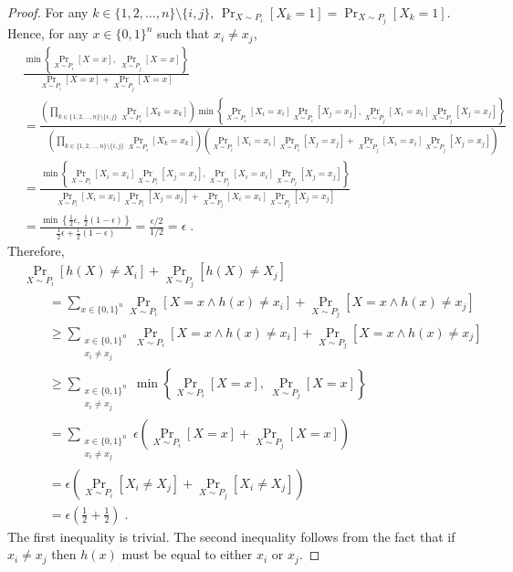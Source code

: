 \documentclass[12pt]{article}
\begin{document}
\begin{proof}
For any $k \in \{1,2,\dots,n\} \setminus \{i,j\}$, $\Pr_{X \sim P_i}[X_k = 1] = \Pr_{X \sim P_j}[X_k = 1]$.
Hence, for any $x \in \{0,1\}^n$ such that $x_i \neq x_j$,
\begin{align*}
& \frac{\displaystyle \min \left\{ \Pr_{X \sim P_i}[X = x], \ \Pr_{X \sim P_j}[X = x] \right\}}{\displaystyle \Pr_{X \sim P_i}[X = x] + \Pr_{X \sim P_j}[X = x]} \\
& =  \frac{ \displaystyle
\left( \prod_{k \in \{1,2,\dots,n\} \setminus \{i,j\}} \Pr_{X \sim P_i}[X_k = x_k] \right) \min \left\{ \Pr_{X \sim P_i}[X_i = x_i] \Pr_{X \sim P_i}[X_j = x_j], \Pr_{X \sim P_j}[X_i = x_i] \Pr_{X \sim P_j}[X_j = x_j]  \right\}
}{ \displaystyle
\left( \prod_{k \in \{1,2,\dots,n\} \setminus \{i,j\}} \Pr_{X \sim P_i}[X_k = x_k] \right) \left( \Pr_{X \sim P_i}[X_i = x_i] \Pr_{X \sim P_i}[X_j = x_j] + \Pr_{X \sim P_j}[X_i = x_i] \Pr_{X \sim P_j}[X_j = x_j]  \right)
} \\
& = \frac{ \displaystyle \min \left\{ \Pr_{X \sim P_i}[X_i = x_i] \Pr_{X \sim P_i}[X_j = x_j], \Pr_{X \sim P_j}[X_i = x_i] \Pr_{X \sim P_j}[X_j = x_j]  \right\}
}{ \displaystyle \Pr_{X \sim P_i}[X_i = x_i] \Pr_{X \sim P_i}[X_j = x_j] + \Pr_{X \sim P_j}[X_i = x_i] \Pr_{X \sim P_j}[X_j = x_j] } \\
& = \frac{ \displaystyle \min \left\{ \frac{1}{2} \epsilon, \ \frac{1}{2} (1-\epsilon) \right\}
}{ \displaystyle \frac{1}{2} \epsilon + \frac{1}{2} (1-\epsilon) } = \frac{\epsilon/2}{1/2} = \epsilon \; .
\end{align*}
Therefore,
\begin{align*}
& \Pr_{X \sim P_i}[h(X) \neq X_i] + \Pr_{X \sim P_j}[h(X) \neq X_j] \\
& \qquad = \sum_{x \in \{0,1\}^n} \Pr_{X \sim P_i}[X = x \wedge h(x) \neq x_i] + \Pr_{X \sim P_j}[X = x \wedge h(x) \neq x_j] \\
& \qquad \ge \sum_{\substack{x \in \{0,1\}^n \\ x_i \neq x_j}} \Pr_{X \sim P_i}[X = x \wedge h(x) \neq x_i] + \Pr_{X \sim P_j}[X = x \wedge h(x) \neq x_j] \\
& \qquad \ge \sum_{\substack{x \in \{0,1\}^n \\ x_i \neq x_j}} \min \left\{ \Pr_{X \sim P_i}[X = x], \ \Pr_{X \sim P_j}[X = x] \right\} \\
& \qquad = \sum_{\substack{x \in \{0,1\}^n \\ x_i \neq x_j}} \epsilon \left( \Pr_{X \sim P_i}[X = x] + \Pr_{X \sim P_j}[X = x] \right) \\
& \qquad = \epsilon \left( \Pr_{X \sim P_i}[X_i \neq X_j] + \Pr_{X \sim P_j}[X_i \neq X_j] \right) \\
& \qquad = \epsilon \left( \frac{1}{2} + \frac{1}{2} \right) \; .
\end{align*}
The first inequality is trivial. The second inequality follows from the fact that
if $x_i \neq x_j$ then $h(x)$ must be equal to either $x_i$ or $x_j$.
\end{proof}
\end{document}
